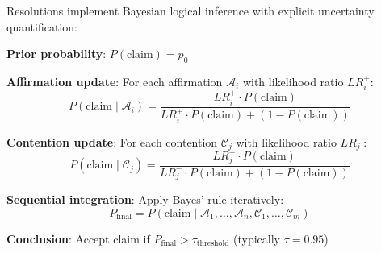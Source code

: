 \begin{theorem}
\label{thm:resolution_inference}
Resolutions implement Bayesian logical inference with explicit uncertainty quantification:

\textbf{Prior probability}: $P(\text{claim}) = p_0$

\textbf{Affirmation update}: For each affirmation $\mathcal{A}_i$ with likelihood ratio $LR_i^+$:
\begin{equation}
P(\text{claim} \mid \mathcal{A}_i) = \frac{LR_i^+ \cdot P(\text{claim})}{LR_i^+ \cdot P(\text{claim}) + (1 - P(\text{claim}))}
\end{equation}

\textbf{Contention update}: For each contention $\mathcal{C}_j$ with likelihood ratio $LR_j^-$:
\begin{equation}
P(\text{claim} \mid \mathcal{C}_j) = \frac{LR_j^- \cdot P(\text{claim})}{LR_j^- \cdot P(\text{claim}) + (1 - P(\text{claim}))}
\end{equation}

\textbf{Sequential integration}: Apply Bayes' rule iteratively:
\begin{equation}
P_{\text{final}} = P(\text{claim} \mid \mathcal{A}_1, \ldots, \mathcal{A}_n, \mathcal{C}_1, \ldots, \mathcal{C}_m)
\end{equation}

\textbf{Conclusion}: Accept claim if $P_{\text{final}} > \tau_{\text{threshold}}$ (typically $\tau = 0.95$)
\end{theorem}


